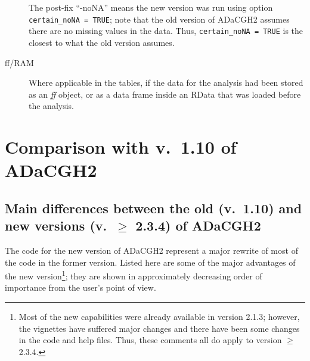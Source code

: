 \documentclass[a4paper,11pt]{article}
\begin{document}
\begin{description}
  The post-fix ``-noNA'' means the new version was run using option
  \texttt{certain\_noNA = TRUE}; note that the old version of ADaCGH2
  assumes there are no missing values in the data. Thus,
  \texttt{certain\_noNA = TRUE} is the closest to what the old version assumes. 

\item[ff/RAM] Where applicable in the tables, if the data for the analysis
  had been stored as an \textit{ff} object, or as a data frame inside an
  RData that was loaded before the analysis.
  

\end{description}



\clearpage
\section{Comparison with v.\ 1.10 of ADaCGH2}

\subsection{Main differences between the old (v.\ 1.10) and new versions
  (v.\ $\ge$ 2.3.4) of ADaCGH2}


The code for the new version of ADaCGH2 represent a major rewrite of most
of the code in the former version. Listed here are some of the major
advantages of the new version\footnote{Most of the new capabilities were
  already available in version 2.1.3; however, the vignettes have suffered
  major changes and there have been some changes in the code and help
  files. Thus, these comments all do apply to version $\ge$ 2.3.4.}; they
are shown in approximately decreasing order of importance from the user's
point of view.
\end{document}
